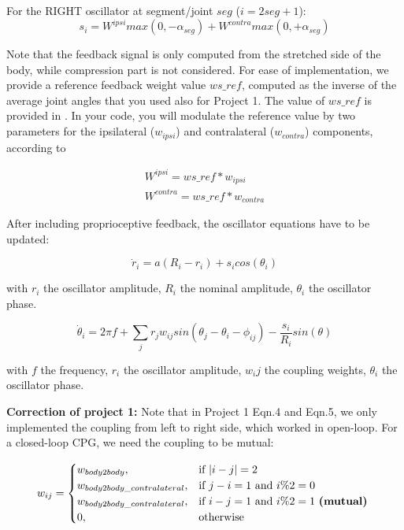 \documentclass{cmc}
\begin{document}
For the RIGHT oscillator at segment/joint $seg$ ($i = 2seg + 1$):
\begin{equation}
  \label{eq:stot_right}
  s_i = W^{ipsi}max(0, -\alpha_{seg}) + W^{contra}max(0, +\alpha_{seg})
\end{equation}

Note that the feedback signal is only computed from the stretched side of the body, while
compression part is not considered.
For ease of implementation, we provide a reference feedback weight value $ws\_ref$,
computed as the inverse of the average joint angles that you used also for Project 1.
The value of $ws\_ref$ is provided in .
In your code, you will modulate the reference value by two parameters
for the ipsilateral ($w_{ipsi}$) and contralateral ($w_{contra}$) components, according to

 \begin{eqnarray}
  \label{eq:s_weight}
  W^{ipsi}   = ws\_ref * w_{ipsi}    \quad \\
  W^{contra} = ws\_ref * w_{contra}
\end{eqnarray}

After including proprioceptive feedback, the oscillator equations have to be updated:


\begin{equation}
  \label{eq:damplitude}
  \dot{r}_i = a(R_i-r_i)+s_icos(\theta_i)
\end{equation}

with $ r_i $ the
oscillator amplitude, $ R_i $ the nominal amplitude, $\theta_i$ the oscillator phase.

\begin{equation}
  \label{eq:dphase}
  \dot{\theta}_i = 2 \pi f + \sum_j r_j w_{ij} sin(\theta_j - \theta_i - \phi_{ij}) - \frac{s_i}{R_i}sin(\theta)
\end{equation}

with $ f $ the frequency, $ r_i $ the
oscillator amplitude, $ w_ij $ the coupling weights, $\theta_i$ the oscillator phase.

\textbf{Correction of project 1: }
Note that in Project 1 Eqn.4 and Eqn.5, we only implemented the coupling from left to right side,
which worked in open-loop. For a closed-loop CPG, we need the coupling to be mutual:

\begin{equation}
  \label{eq:dcw}
  w_{ij} =
    \begin{cases}
    w_{body2body},& \text{if } |i-j|=2 \\
    w_{body2body\_contralateral}, & \text{if }  j-i=1 \text{ and } i\%2=0\\
    w_{body2body\_contralateral}, & \text{if }  i-j=1 \text{ and } i\%2=1 \text{ \textbf{(mutual)} }\\
    0, & \text{otherwise} \\
    \end{cases}
\end{equation}
\end{document}
